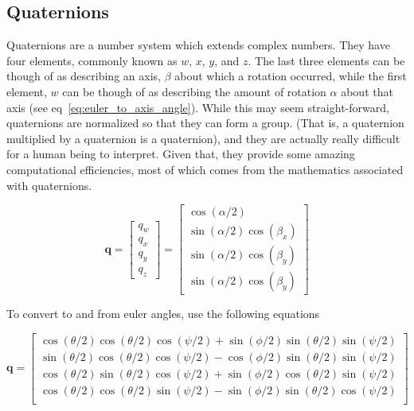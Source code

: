 \documentclass[paper=a4, fontsize=11pt]{scrartcl} %
\numberwithin{equation}{section} %
\numberwithin{figure}{section} %
\numberwithin{table}{section} %
\begin{document}
\subsection{Quaternions}

Quaternions are a number system which extends complex numbers.  They have four elements, commonly known as $w$, $x$, $y$, and $z$.  The last three elements can be though of as describing an axis, $\beta$ about which a rotation occurred, while the first element, $w$ can be though of as describing the amount of rotation $\alpha$ about that axis (see eq~\ref{eq:euler_to_axis_angle}).  While this may seem straight-forward, quaternions are normalized so that they can form a group.  (That is, a quaternion multiplied by a quaternion is a quaternion), and they are actually really difficult for a human being to interpret.  Given that, they provide some amazing computational efficiencies, most of which comes from the mathematics associated with quaternions.  

\begin{equation}
	\bm{q} = \begin{bmatrix}
				q_w \\
				q_x \\
				q_y \\
				q_z 
			 \end{bmatrix} 
		   = \begin{bmatrix}
				\cos(\alpha/2) \\
				\sin(\alpha/2)\cos(\beta_x) \\
				\sin(\alpha/2)\cos(\beta_y) \\
				\sin(\alpha/2)\cos(\beta_y) 
			 \end{bmatrix}
	\label{eq:euler_to_axis_angle}
\end{equation}

To convert to and from euler angles, use the following equations

\begin{equation}
	\bm{q} = 
	  \begin{bmatrix}
	  	\cos(\theta/2)\cos(\theta/2)\cos(\psi/2) + \sin(\phi/2)\sin(\theta/2)\sin(\psi/2) \\
	  	\sin(\theta/2)\cos(\theta/2)\cos(\psi/2) - \cos(\phi/2)\sin(\theta/2)\sin(\psi/2) \\
	  	\cos(\theta/2)\sin(\theta/2)\cos(\psi/2) + \sin(\phi/2)\cos(\theta/2)\sin(\psi/2) \\
	  	\cos(\theta/2)\cos(\theta/2)\sin(\psi/2) - \sin(\phi/2)\sin(\theta/2)\cos(\psi/2) \\
	  \end{bmatrix}
\end{equation}
\end{document}
